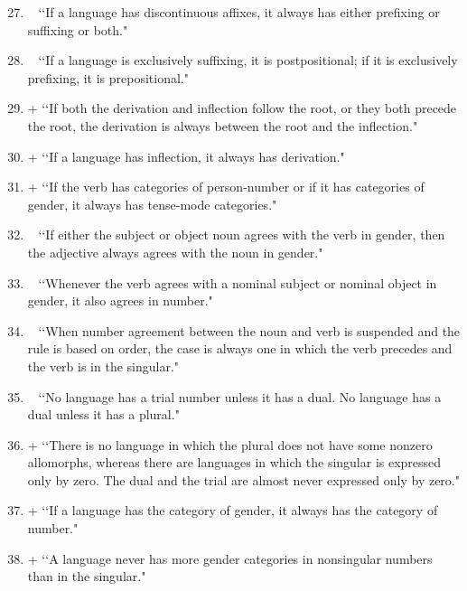 \begin{enumerate}
\setcounter{enumi}{26}
\item ~  \lq\lq If a language has discontinuous affixes, it always has either prefixing or suffixing or both." 

\item ~  \lq\lq If a language is exclusively suffixing, it is postpositional; if it is exclusively prefixing, it is prepositional." 

\item +  \lq\lq If both the derivation and inflection follow the root, or they both precede the root, the derivation is always between the root and the inflection." 

\item +  \lq\lq If a language has inflection, it always has derivation." 

\item +  \lq\lq If the verb has categories of person-number or if it has categories of gender, it always has tense-mode categories." 

\item ~  \lq\lq If either the subject or object noun agrees with the verb in gender, then the adjective always agrees with the noun in gender." 

\item ~  \lq\lq Whenever the verb agrees with a nominal subject or nominal object in gender, it also agrees in number." 

\item ~  \lq\lq When number agreement between the noun and verb is suspended and the rule is based on order, the case is always one in which the verb precedes and the verb is in the singular." 

\item ~  \lq\lq No language has a trial number unless it has a dual. No language has a dual unless it has a plural." 

\item +  \lq\lq There is no language in which the plural does not have some nonzero allomorphs, whereas there are languages in which the singular is expressed only by zero. The dual and the trial are almost never expressed only by zero." 

\item +  \lq\lq If a language has the category of gender, it always has the category of number." 

\item +  \lq\lq A language never has more gender categories in nonsingular numbers than in the singular." 


\end{enumerate}
